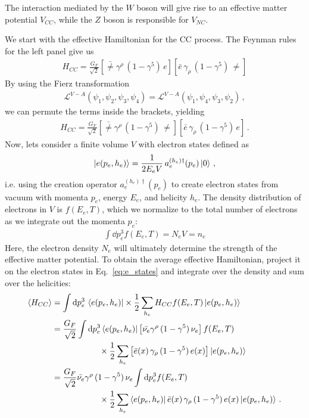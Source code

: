 The interaction mediated by the $W$ boson will give rise to an effective matter potential $V_{CC}$, while
the $Z$ boson is responsible for $V_{NC}$.

We start with the effective Hamiltonian for the CC process. The Feynman rules for the left panel give us 
\begin{align}
    H_{CC} = \frac{G_F}{\sqrt{2}}\left[ \bar\ne \gamma^\rho\, (1- \gamma^5)\, e \right] \left[\bar e \,\gamma_\rho\, (1- \gamma^5)\, \ne \right]
\end{align}
By using the Fierz transformation 
\begin{align}
    \mathcal{L}^{V-A}(\psi_1,\psi_2,\psi_3,\psi_4) = \mathcal{L}^{V-A}(\psi_1,\psi_4,\psi_3,\psi_2)\,,
\end{align}
we can permute the terms inside the brackets, yielding
\begin{align}\label{eq:H_fierz}
    H_{CC} = \frac{G_F}{\sqrt{2}}\left[ \bar\ne \gamma^\rho\, (1- \gamma^5)\, \ne \right] \left[\bar e \,\gamma_\rho\, (1- \gamma^5)\, e \right]\,.
\end{align}
Now, lets consider a finite volume $V$ with electron states defined as 
\begin{align}\label{eq:e_states}
    \ket{e(p_e,h_e)} = \frac{1}{2E_eV}\, a_e^{(h_e)\dagger}(p_e)\ket{0}\,,
\end{align}
i.e. using the creation operator $a_e^{(h_e)\dagger}(p_e)$ to create electron states from vacuum with momenta $p_e$, energy $E_e$, and helicity $h_e$.
The density distribution of electrons in $V$ is $f(E_e,T)$, which we normalize to the total number of electrons as we integrate out the momenta $p_e$:
\begin{align}\label{eq:e_density}
    \int \dd p_e^3 f(E_e,T) = N_e V = n_e
\end{align}
Here, the electron density $N_e$ will ultimately determine the strength of the effective matter potential. 
To obtain the average effective Hamiltonian, project it on the electron states in Eq.~\ref{eq:e_states} and integrate over the density and sum over the helicities:
\begin{align}\label{eq:avg_H1}
    \left\langle {H_{CC}} \right \rangle &= \int \dd p_e^3\, \bra{e(p_e,h_e)} \times \frac{1}{2} \sum_{h_e} H_{CC}   f(E_e,T) \ket{e(p_e,h_e)} \nonumber \\
           &= \frac{G_F}{\sqrt{2}} \int \dd p_e^3 \bra{e(p_e,h_e)} \left[ \bar{\nu_e} \gamma^\rho\, (1- \gamma^5)\, \nu_e \right]  f(E_e,T) \nonumber \\
           &\hspace{2cm}\times \frac{1}{2} \sum_{h_e} \left[\bar e(x) \,\gamma_\rho\, (1- \gamma^5)\, e(x) \right] \ket{e(p_e,h_e)} \nonumber \\
           &= \frac{G_F}{\sqrt{2}} \bar{\nu_e} \gamma^\rho\, (1- \gamma^5)\, \nu_e \int \dd p_e^3  f(E_e,T) \nonumber \\
           &\hspace{2cm} \times \frac{1}{2} \sum_{h_e} \bra{e(p_e,h_e)} \bar e(x) \,\gamma_\rho\, (1- \gamma^5)\, e(x)   \ket{e(p_e,h_e)}\,.
\end{align}
